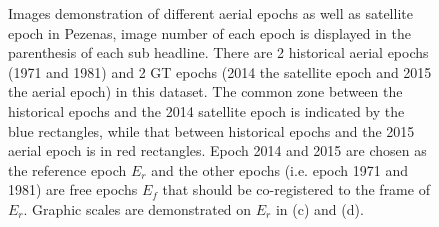\begin{figure}[htbp]
\begin{center}
{        }
        \caption{Images demonstration of different aerial epochs as well as satellite epoch in Pezenas, image number of each epoch is displayed in the parenthesis of each sub headline. There are 2 historical aerial epochs (1971 and 1981) and 2 \ac{GT} epochs (2014 the satellite epoch and 2015 the aerial epoch) in this dataset. The common zone between the historical epochs and the 2014 satellite epoch is indicated by the blue rectangles, while that between historical epochs and the 2015 aerial epoch is in red rectangles. Epoch 2014 and 2015 are chosen as the reference epoch $E_r$ and the other epochs (i.e. epoch 1971 and 1981) are free epochs $E_f$ that should be co-registered to the frame of $E_r$. Graphic scales are demonstrated on $E_r$ in (c) and (d).}
        \label{PezenasData}
    \end{center}
\end{figure} 


